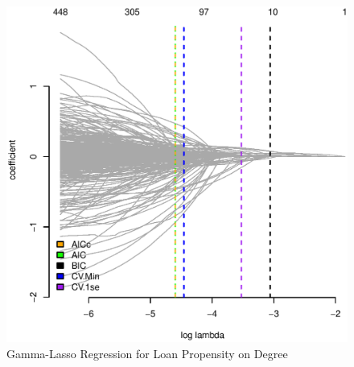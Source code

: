 \documentclass[11pt, fleqn]{article}
\begin{document}
\begin{figure}[!htb]
  \centering
  \includegraphics[scale=.5]{treat_aic.eps}
  \caption{Gamma-Lasso Regression for Loan Propensity on Degree}
  \label{fig:causal_aic}
\end{figure}


\end{document}
